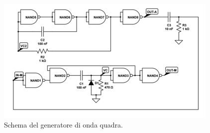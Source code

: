 \documentclass[10pt,a4paper]{article}
\begin{document}

\begin{figure}[!htb]
  \centering
  \includegraphics[scale=0.5]{generatorequadra.png}
\caption{Schema del generatore di onda quadra.\label{generatorequadra}}
\label{pin}
\end{figure}
\end{document}
